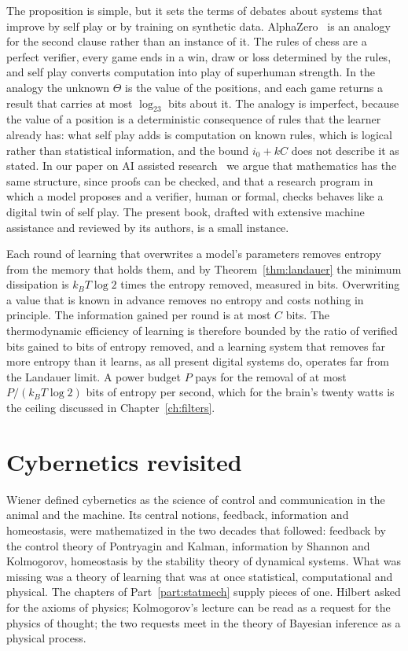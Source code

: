 The proposition is simple, but it sets the terms of debates about systems that improve by self play or by training on synthetic data. AlphaZero~\cite{silver2018} is an analogy for the second clause rather than an instance of it. The rules of chess are a perfect verifier, every game ends in a win, draw or loss determined by the rules, and self play converts computation into play of superhuman strength. In the analogy the unknown $\Theta$ is the value of the positions, and each game returns a result that carries at most $\log_23$ bits about it. The analogy is imperfect, because the value of a position is a deterministic consequence of rules that the learner already has: what self play adds is computation on known rules, which is logical rather than statistical information, and the bound $i_0+kC$ does not describe it as stated. In our paper on AI assisted research~\cite{polsonsokolov2026air} we argue that mathematics has the same structure, since proofs can be checked, and that a research program in which a model proposes and a verifier, human or formal, checks behaves like a digital twin of self play. The present book, drafted with extensive machine assistance and reviewed by its authors, is a small instance.

Each round of learning that overwrites a model's parameters removes entropy from the memory that holds them, and by Theorem~\ref{thm:landauer} the minimum dissipation is $k_BT\log2$ times the entropy removed, measured in bits. Overwriting a value that is known in advance removes no entropy and costs nothing in principle. The information gained per round is at most $C$ bits. The thermodynamic efficiency of learning is therefore bounded by the ratio of verified bits gained to bits of entropy removed, and a learning system that removes far more entropy than it learns, as all present digital systems do, operates far from the Landauer limit. A power budget $P$ pays for the removal of at most $P/(k_BT\log2)$ bits of entropy per second, which for the brain's twenty watts is the ceiling discussed in Chapter~\ref{ch:filters}.

\section{Cybernetics revisited}

Wiener defined cybernetics as the science of control and communication in the animal and the machine. Its central notions, feedback, information and homeostasis, were mathematized in the two decades that followed: feedback by the control theory of Pontryagin and Kalman, information by Shannon and Kolmogorov, homeostasis by the stability theory of dynamical systems. What was missing was a theory of learning that was at once statistical, computational and physical. The chapters of Part~\ref{part:statmech} supply pieces of one. Hilbert asked for the axioms of physics; Kolmogorov's lecture can be read as a request for the physics of thought; the two requests meet in the theory of Bayesian inference as a physical process.

